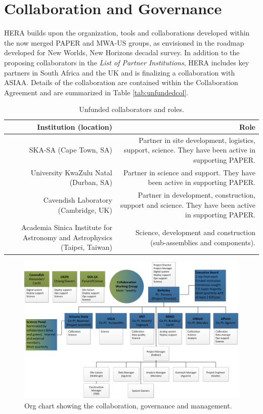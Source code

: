 \documentclass[preprint]{aastex}
\begin{document}
\section{Collaboration and Governance}
HERA builds upon the organization, tools and collaborations developed within the now
merged PAPER and MWA-US groups, as envisioned in the roadmap developed for New
Worlds, New Horizons decadal survey. In addition to the proposing collaborators in
the {\em List of Partner Institutions}, HERA includes key partners in South Africa
and the UK and is finalizing a collaboration with ASIAA.  Details of the collaboration are 
contained within the Collaboration Agreement and are summarized in Table \ref{tab:unfundedcol}.
\begin{table}[h]
\caption{Unfunded collaborators and roles.}
\label{tab:unfundedcol}
\begin{tabular}{| r{} | r{} |}\hline
\textbf{Institution (location)} & \textbf{Role} \tabularnewline \hline
SKA-SA (Cape Town, SA) & Partner in site development, logistics, support, science. They have been active in supporting PAPER.\tabularnewline \hline
University KwaZulu Natal (Durban, SA) & Partner in science and support. They have been active in supporting PAPER.\tabularnewline \hline
Cavendish Laboratory (Cambridge, UK) & Partner in development, construction, support and science.  They have been active in supporting PAPER. \tabularnewline \hline
Academia Sinica Institute for Astronomy and Astrophysics (Taipei, Taiwan) & Science, development and construction (sub-assemblies and components). \tabularnewline \hline
\end{tabular}
\label{tab:otherpartners}
\end{table}

\begin{figure}[h]
\centering
\includegraphics[width=\textwidth]{plots/org.png}
\caption{\small Org chart showing the collaboration, governance and management.}
\label{fig:org}
\end{figure}
\end{document}
